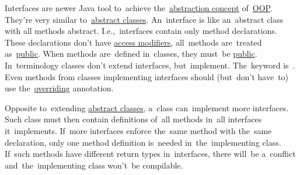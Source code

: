 \label{javainterfaces}
Interfaces are newer Java tool to~achieve the~\hyperref[abstraction]{abstraction concept} of~\hyperref[objectorientedprogramming]{OOP}.
They're very similar to~\hyperref[javaabstractclasses]{abstract classes}.
An~interface is like an~abstract class with all methods abstract.
I.e.,~interfaces contain only method declarations.
These declarations don't have \hyperref[javaaccessmodifiers]{access modifiers}, all~methods are~treated as~\hyperref[javapublic]{public}.
When methods are~defined in~classes, they must~be \hyperref[javapublic]{public}.
In~terminology classes don't extend interfaces, but~implement.
The~keyword is~.
Even methods from classes implementing interfaces should (but~don't have~to) use the~\hyperref[javaoverride]{overriding} annotation.

Opposite to~extending \hyperref[javaabstractclasses]{abstract classes}, a~class can~implement more interfaces.
Such class must then contain definitions of~all methods in~all interfaces it~implements.
If~more interfaces enforce the~same method with the~same declaration, only one method definition is~needed in~the~implementing class.
If~such methods have different return types in~interfaces, there will~be a~conflict and~the~implementing class won't~be compilable.
\newpage

